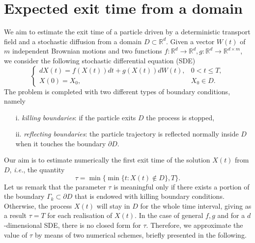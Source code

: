 \section{Expected exit time from a domain}
We aim to estimate the exit time of a particle driven by a deterministic transport field and a stochastic diffusion from a domain $D \subset \mathbb{R}^d$. Given a vector $W(t)$ of $m$ independent Brownian motions and two functions $f\colon \mathbb{R}^d \rightarrow \mathbb{R}^d, g \colon \mathbb{R}^d \rightarrow \mathbb{R}^{d\times m}$, we consider the following stochastic differential equation (SDE)
\begin{equation}\label{eq:GeneralModel}
\begin{cases}
	dX(t) = f(X(t)) dt + g(X(t))dW(t), & 0 < t \leq T, \\
	X(0)  = X_0, & X_0 \in D.
\end{cases}
\end{equation}
The problem is completed with two different types of boundary conditions, namely
\begin{itemize}
	\item[i.]  \textit{killing boundaries}: if the particle exits $D$ the process is stopped,
	\item[ii.] \textit{reflecting boundaries}: the particle trajectory is reflected normally inside $D$ when it touches the boundary $\partial D$.
\end{itemize}
Our aim is to estimate numerically the first exit time of the solution $X(t)$ from $D$, \textit{i.e.}, the quantity
\begin{equation}\label{eq:GeneralTau}
	\tau = \min\{\min\{t\colon X(t)\notin D\},T\}.
\end{equation}
Let us remark that the parameter $\tau$ is meaningful only if there exists a portion of the boundary $\Gamma_k \subset \partial D$ that is endowed with killing boundary conditions. Otherwise, the process $X(t)$ will stay in $D$ for the whole time interval, giving as a result $\tau = T$ for each realisation of $X(t)$. In the case of general $f,g$ and for a $d$-dimensional SDE, there is no closed form for $\tau$. Therefore, we approximate the value of $\tau$ by means of two numerical schemes, briefly presented in the following.




